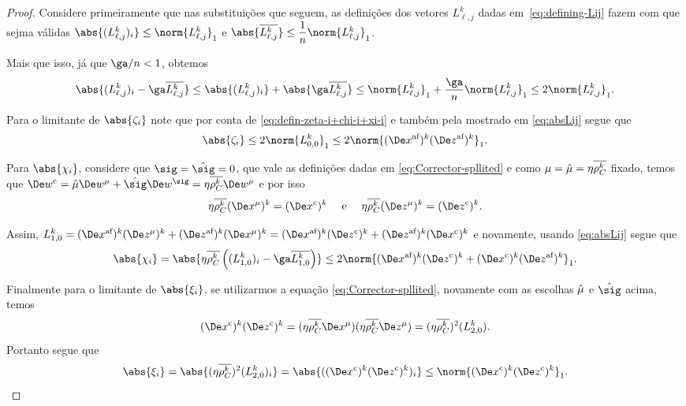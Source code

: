 \begin{proof}
Considere primeiramente que nas substituições que seguem, as definições dos vetores $L_{\ell,j}^{k}$ dadas em~\eqref{eq:defining-Lij} fazem com que sejma válidas $\abs{({L_{\ell,j}^{k}})_{i}} \leq \norm{L_{\ell,j}^{k}}_{1}$ e $\abs{\dbvec{L_{\ell,j}^{k}}} \leq \dfrac{1}{n}\norm{L_{\ell,j}^{k}}_{1}$.

Mais que isso, já que $\ga/n < 1$, obtemos
\begin{equation}\label{eq:absLij}
 	\abs{({L_{\ell,j}^{k}})_{i} - \ga\dbvec{L_{\ell,j}^{k}}} \leq  	\abs{({L_{\ell,j}^{k}})_{i}} + \abs{\ga\dbvec{L_{\ell,j}^{k}}} \leq  \norm{L_{\ell,j}^{k}}_{1}+ \frac{\ga}{n}\norm{L_{\ell,j}^{k}}_{1} \leq 2 \norm{L_{\ell,j}^{k}}_{1}.
 \end{equation} 

Para o limitante de $\abs{\zeta_{i}}$ note que por conta de \eqref{eq:defin-zeta-i+chi-i+xi-i} e também pela mostrado em  \eqref{eq:absLij} segue que 
\begin{equation}
\abs{\zeta_i}    \leq 2\norm{L_{0,0}^{k}}_1 \label{eq:bound-zeta-i} \leq 2\norm{ \dekx  \dekz }_1.   %
\end{equation}

Para $\abs{\chi_{i}}$, considere que   $\sig = \nextsig=0$, que vale as definições dadas em \eqref{eq:Corrector-spllited} e como  $\mu=\hat{\mu} = \eta\overline{\rho_C^{k}}$ fixado, temos que $\Decow = \nextmu \Dew^{\mu} + \nextsig
\Dew^{\sig} = \eta\rhoCkb \Dew^\mu $ e por isso 
	\[
		 \eta\rhoCkb (\Dex^\mu)^{k} = \Dekcox     \quad \text{ e } \quad    \eta\rhoCkb (\Dez^\mu)^{k} = \Dekcoz .
	\]

	Assim, $ L_{1,0}^{k} = \dekx(\Dez^\mu)^{k} +
			\dekz(\Dex^\mu)^{k} = \dekx\Dekcoz +
			\dekz\Dekcox $ e novamente, usando  \eqref{eq:absLij} segue que
\begin{equation}\label{eq:bound-chi-i}
	\abs{\chi_i } = \abs{\eta\rhoCkb  \left( ({L_{1,0}^{k}})_i - \ga\dbvec{L_{1,0}^{k}} \right)}  \leq 2 \norm{ \dekx \Dekcoz + \Dekcox \dekz }_1. %
\end{equation}

Finalmente para o limitante de $\abs{\xi_{i}}$, se utilizarmos  a equação \eqref{eq:Corrector-spllited}, novamente com as escolhas $\hat{\mu} $ e $\nextsig$ acima, temos
\[
	\Dekcox\Dekcoz = (\eta\rhoCkb \Dex^\mu)(\eta\rhoCkb \Dez^\mu) = (\eta\rhoCkb )^2(L_{2,0}^{k}).
\]
Portanto segue que
\begin{equation}\label{eq:bound-xi-i}
	\abs{\xi_i}	 =  \abs{(\eta\rhoCkb )^2(L_{2,0}^{k})_i}  = \abs{(\Dekcox\Dekcoz)_i} \leq \norm{\Dekcox\Dekcoz}_1.%
\end{equation}
	



\end{proof}
